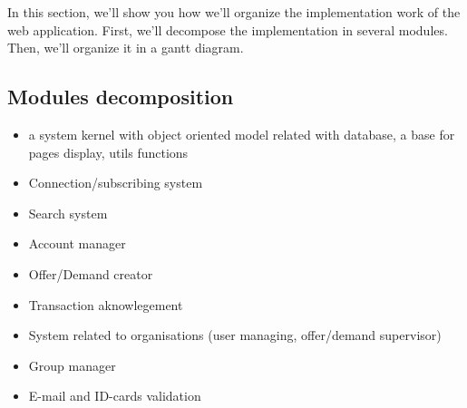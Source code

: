 In this section, we'll show you how we'll organize the implementation work of the web application. First, we'll decompose the implementation in several modules. Then, we'll organize it in a gantt diagram. \\

\subsection{Modules decomposition}
\begin{itemize}
\item a system kernel with object oriented model related with database, a base for pages display, utils functions
\item Connection/subscribing system
\item Search system
\item Account manager
\item Offer/Demand creator
\item Transaction aknowlegement
\item System related to organisations (user managing, offer/demand supervisor)
\item Group manager
\item E-mail and ID-cards validation
\end{itemize}

